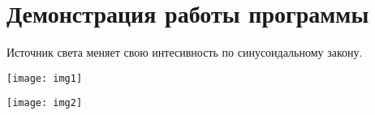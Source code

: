 \graphicspath{{png/}}

\section{Демонстрация работы программы}
Источник света меняет свою интесивность по синусоидальному закону.

\texttt{[image: img1]}

\texttt{[image: img2]}
\pagebreak
